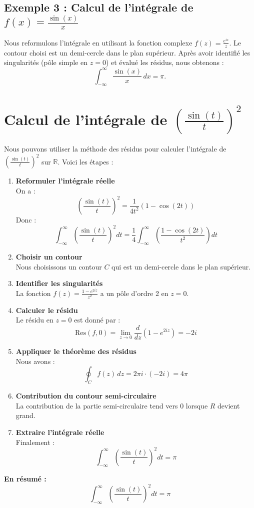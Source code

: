 \documentclass[a4paper,11pt]{article}
\begin{document}
\subsection{Exemple 3 : Calcul de l'intégrale de \( f(x) = \frac{\sin(x)}{x} \)}
Nous reformulons l'intégrale en utilisant la fonction complexe \( f(z) = \frac{e^{iz}}{z} \). Le contour choisi est un demi-cercle dans le plan supérieur. Après avoir identifié les singularités (pôle simple en \( z = 0 \)) et évalué les résidus, nous obtenons :
\[
\int_{-\infty}^{\infty} \frac{\sin(x)}{x} \, dx = \pi.
\]

\section{Calcul de l'intégrale de \( \left(\frac{\sin(t)}{t}\right)^2 \)}

Nous pouvons utiliser la méthode des résidus pour calculer l'intégrale de \( \left(\frac{\sin(t)}{t}\right)^2 \) sur \( \mathbb{R} \). Voici les étapes :

\begin{enumerate}
    \item \textbf{Reformuler l'intégrale réelle} \\
    On a :
    \[
    \left(\frac{\sin(t)}{t}\right)^2 = \frac{1}{4t^2} \left(1 - \cos(2t)\right)
    \]
    Donc :
    \[
    \int_{-\infty}^{\infty} \left(\frac{\sin(t)}{t}\right)^2 dt = \frac{1}{4} \int_{-\infty}^{\infty} \left(\frac{1 - \cos(2t)}{t^2}\right) dt
    \]

    \item \textbf{Choisir un contour} \\
    Nous choisissons un contour \( C \) qui est un demi-cercle dans le plan supérieur.

    \item \textbf{Identifier les singularités} \\
    La fonction \( f(z) = \frac{1 - e^{2iz}}{z^2} \) a un pôle d'ordre 2 en \( z = 0 \).

    \item \textbf{Calculer le résidu} \\
    Le résidu en \( z = 0 \) est donné par :
    \[
    \text{Res}(f, 0) = \lim_{z \to 0} \frac{d}{dz} (1 - e^{2iz}) = -2i
    \]

    \item \textbf{Appliquer le théorème des résidus} \\
    Nous avons :
    \[
    \oint_C f(z) \, dz = 2\pi i \cdot (-2i) = 4\pi
    \]

    \item \textbf{Contribution du contour semi-circulaire} \\
    La contribution de la partie semi-circulaire tend vers 0 lorsque \( R \) devient grand.

    \item \textbf{Extraire l'intégrale réelle} \\
    Finalement :
    \[
    \int_{-\infty}^{\infty} \left(\frac{\sin(t)}{t}\right)^2 dt = \pi
    \]
\end{enumerate}

\textbf{En résumé :}
\[
\int_{-\infty}^{\infty} \left(\frac{\sin(t)}{t}\right)^2 dt = \pi
\]
\end{document}
